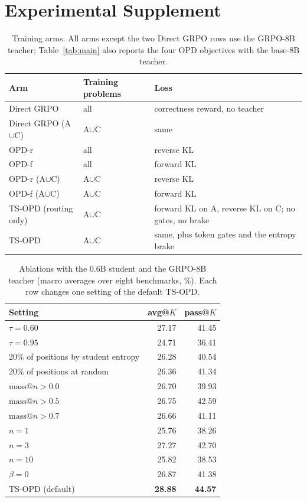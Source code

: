 \documentclass[10pt]{article}
\makeatletter
\newcommand{\avgk}{avg@$K$}
\newcommand{\passk}{pass@$K$}
\newcommand{\tsopd}{TS-OPD}
\newcommand{\tsro}{TS-OPD (routing only)}
\newcommand{\AC}{A$\cup$C}
\makeatother
\begin{document}
\clearpage
\section{Experimental Supplement}

\begin{table}[h]
\centering
\small
\caption{Training arms. All arms except the two Direct GRPO rows use the GRPO-8B
teacher; Table~\ref{tab:main} also reports the four OPD objectives with the
base-8B teacher.}
\label{tab:arms}
\begin{tabular}{lll}
\toprule
Arm & Training problems & Loss \\
\midrule
Direct GRPO & all & correctness reward, no teacher \\
Direct GRPO (\AC) & \AC & same \\
OPD-r & all & reverse KL \\
OPD-f & all & forward KL \\
OPD-r (\AC) & \AC & reverse KL \\
OPD-f (\AC) & \AC & forward KL \\
\tsro{} & \AC & forward KL on A, reverse KL on C; no gates, no brake \\
\tsopd{} & \AC & same, plus token gates and the entropy brake \\
\bottomrule
\end{tabular}
\end{table}

\begin{table}[h]
\centering
\small
\caption{Ablations with the 0.6B student and the GRPO-8B teacher (macro averages
over eight benchmarks, \%). Each row changes one setting of the default
\tsopd{}.}
\label{tab:ablation}
\begin{tabular}{lrr}
\toprule
Setting & \avgk{} & \passk{} \\
\midrule
$\tau=0.60$ & 27.17 & 41.45 \\
$\tau=0.95$ & 24.71 & 36.41 \\
20\% of positions by student entropy & 26.28 & 40.54 \\
20\% of positions at random & 26.36 & 41.34 \\
$\mathrm{mass@}n>0.0$ & 26.70 & 39.93 \\
$\mathrm{mass@}n>0.5$ & 26.75 & 42.59 \\
$\mathrm{mass@}n>0.7$ & 26.66 & 41.11 \\
$n=1$ & 25.76 & 38.26 \\
$n=3$ & 27.27 & 42.70 \\
$n=10$ & 25.82 & 38.53 \\
$\beta=0$ & 26.87 & 41.38 \\
\midrule
\tsopd{} (default) & \textbf{28.88} & \textbf{44.57} \\
\bottomrule
\end{tabular}
\end{table}
\end{document}
